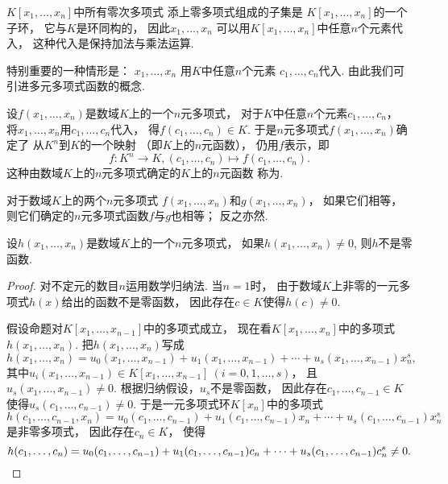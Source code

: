 \(K[x_1,\dotsc,x_n]\)中所有零次多项式
添上零多项式组成的子集是
\(K[x_1,\dotsc,x_n]\)的一个子环，
它与\(K\)是环同构的，
因此\(x_1,\dotsc,x_n\)
可以用\(K[x_1,\dotsc,x_n]\)中任意\(n\)个元素代入，
这种代入是保持加法与乘法运算.

特别重要的一种情形是：
\(x_1,\dotsc,x_n\)
用\(K\)中任意\(n\)个元素
\(c_1,\dotsc,c_n\)代入.
由此我们可引进多元多项式函数的概念.

设\(f(x_1,\dotsc,x_n)\)是数域\(K\)上的一个\(n\)元多项式，
对于\(K\)中任意\(n\)个元素\(c_1,\dotsc,c_n\)，
将\(x_1,\dotsc,x_n\)用\(c_1,\dotsc,c_n\)代入，
得\(f(c_1,\dotsc,c_n) \in K\).
于是\(n\)元多项式\(f(x_1,\dotsc,x_n)\)确定了
从\(K^n\)到\(K\)的一个映射
（即\(K\)上的\(n\)元函数），
仍用\(f\)表示，即\[
	f\colon
	K^n \to K,
	(c_1,\dotsc,c_n)
	\mapsto
	f(c_1,\dotsc,c_n).
\]
这种由数域\(K\)上的\(n\)元多项式确定的\(K\)上的\(n\)元函数
称为.

对于数域\(K\)上的两个\(n\)元多项式
\(f(x_1,\dotsc,x_n)\)和\(g(x_1,\dotsc,x_n)\)，
如果它们相等，
则它们确定的\(n\)元多项式函数\(f\)与\(g\)也相等；
反之亦然.

\begin{lemma}\label{theorem:多项式.多元多项式环.引理1}
设\(h(x_1,\dotsc,x_n)\)是数域\(K\)上的一个\(n\)元多项式，
如果\(h(x_1,\dotsc,x_n)\neq0\),
则\(h\)不是零函数.
\begin{proof}
对不定元的数目\(n\)运用数学归纳法.
当\(n=1\)时，
由于数域\(K\)上非零的一元多项式\(h(x)\)给出的函数不是零函数，
因此存在\(c \in K\)使得\(h(c)\neq0\).

假设命题对\(K[x_1,\dotsc,x_{n-1}]\)中的多项式成立，
现在看\(K[x_1,\dotsc,x_n]\)中的多项式\(h(x_1,\dotsc,x_n)\).
把\(h(x_1,\dotsc,x_n)\)写成\[
	h(x_1,\dotsc,x_n)
	=u_0(x_1,\dotsc,x_{n-1})
	+u_1(x_1,\dotsc,x_{n-1})
	+\dotsb
	+u_s(x_1,\dotsc,x_{n-1}) x_n^s,
\]
其中\(u_i(x_1,\dotsc,x_{n-1}) \in K[x_1,\dotsc,x_{n-1}]\ (i=0,1,\dotsc,s)\)，
且\(u_s(x_1,\dotsc,x_{n-1})\neq0\).
根据归纳假设，\(u_s\)不是零函数，
因此存在\(c_1,\dotsc,c_{n-1} \in K\)
使得\(u_s(c_1,\dotsc,c_{n-1})\neq0\).
于是一元多项式环\(K[x_n]\)中的多项式\[
	h(c_1,\dotsc,c_{n-1},x_n)
	=u_0(c_1,\dotsc,c_{n-1})
	+u_1(c_1,\dotsc,c_{n-1}) x_n
	+\dotsb
	+u_s(c_1,\dotsc,c_{n-1}) x_n^s
\]是非零多项式，
因此存在\(c_n \in K\)，
使得\[
	h(c_1,\dotsc,c_n)
	=u_0(c_1,\dotsc,c_{n-1})
	+u_1(c_1,\dotsc,c_{n-1}) c_n
	+\dotsb
	+u_s(c_1,\dotsc,c_{n-1}) c_n^s
	\neq0.
	\qedhere
\]
\end{proof}
\end{lemma}

